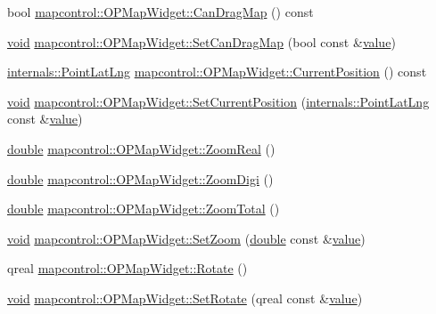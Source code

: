 \begin{DoxyCompactItemize}
bool \hyperlink{group___o_p_map_widget_ga2c73815e5add0186091174a0dabad975}{mapcontrol\-::\-O\-P\-Map\-Widget\-::\-Can\-Drag\-Map} () const 
\item 
\hyperlink{group___u_a_v_objects_plugin_ga444cf2ff3f0ecbe028adce838d373f5c}{void} \hyperlink{group___o_p_map_widget_ga8e9c310f8929536de86a8ed730abde94}{mapcontrol\-::\-O\-P\-Map\-Widget\-::\-Set\-Can\-Drag\-Map} (bool const \&\hyperlink{glext_8h_aa0e2e9cea7f208d28acda0480144beb0}{value})
\item 
\hyperlink{structinternals_1_1_point_lat_lng}{internals\-::\-Point\-Lat\-Lng} \hyperlink{group___o_p_map_widget_ga5da99e2dca74bad302e2a35466a5a2fc}{mapcontrol\-::\-O\-P\-Map\-Widget\-::\-Current\-Position} () const 
\item 
\hyperlink{group___u_a_v_objects_plugin_ga444cf2ff3f0ecbe028adce838d373f5c}{void} \hyperlink{group___o_p_map_widget_ga5144489a16c9bd07abbd0d8adc01656d}{mapcontrol\-::\-O\-P\-Map\-Widget\-::\-Set\-Current\-Position} (\hyperlink{structinternals_1_1_point_lat_lng}{internals\-::\-Point\-Lat\-Lng} const \&\hyperlink{glext_8h_aa0e2e9cea7f208d28acda0480144beb0}{value})
\item 
\hyperlink{_super_l_u_support_8h_a8956b2b9f49bf918deed98379d159ca7}{double} \hyperlink{group___o_p_map_widget_gae56c86fccffa01f54944d431af98a7b9}{mapcontrol\-::\-O\-P\-Map\-Widget\-::\-Zoom\-Real} ()
\item 
\hyperlink{_super_l_u_support_8h_a8956b2b9f49bf918deed98379d159ca7}{double} \hyperlink{group___o_p_map_widget_gaf7a725070972e7158ec0f5b10a0d9cd3}{mapcontrol\-::\-O\-P\-Map\-Widget\-::\-Zoom\-Digi} ()
\item 
\hyperlink{_super_l_u_support_8h_a8956b2b9f49bf918deed98379d159ca7}{double} \hyperlink{group___o_p_map_widget_ga2060cbfea71913a458f3a6f0c6dad8c5}{mapcontrol\-::\-O\-P\-Map\-Widget\-::\-Zoom\-Total} ()
\item 
\hyperlink{group___u_a_v_objects_plugin_ga444cf2ff3f0ecbe028adce838d373f5c}{void} \hyperlink{group___o_p_map_widget_ga63fe346f4ea58f09453ccd42ffe87260}{mapcontrol\-::\-O\-P\-Map\-Widget\-::\-Set\-Zoom} (\hyperlink{_super_l_u_support_8h_a8956b2b9f49bf918deed98379d159ca7}{double} const \&\hyperlink{glext_8h_aa0e2e9cea7f208d28acda0480144beb0}{value})
\item 
qreal \hyperlink{group___o_p_map_widget_gaea05eeafa50a244b2356918c2dae0444}{mapcontrol\-::\-O\-P\-Map\-Widget\-::\-Rotate} ()
\item 
\hyperlink{group___u_a_v_objects_plugin_ga444cf2ff3f0ecbe028adce838d373f5c}{void} \hyperlink{group___o_p_map_widget_ga1e6312bc140cbcfa38ac1bd66b278a71}{mapcontrol\-::\-O\-P\-Map\-Widget\-::\-Set\-Rotate} (qreal const \&\hyperlink{glext_8h_aa0e2e9cea7f208d28acda0480144beb0}{value})

\end{DoxyCompactItemize}

